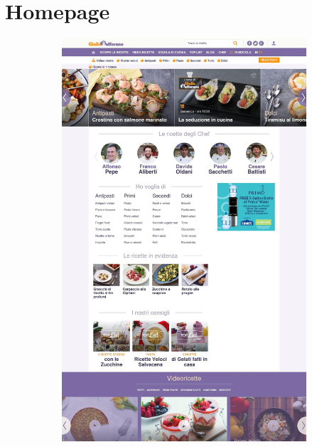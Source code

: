 \section{Homepage}

\begin{figure}[h!]
	\centering
	\begin{subfigure}[b]{0.3\textwidth}
		\includegraphics[scale=0.1]{images/homepage/homepage-1.jpeg}
		\subcaption{}
	\end{subfigure}
	\begin{subfigure}[b]{0.3\textwidth}

\end{subfigure}
\end{figure}
